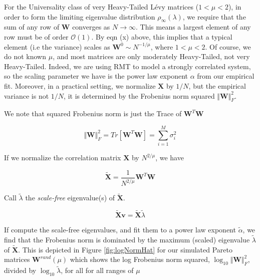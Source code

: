 For the Universality class of very Heavy-Tailed L\'evy matrices ($1<\mu<2$), in order to form the limiting eigenvalue distribution $\rho_{\infty}(\lambda)$,
we require that the sum of any row of $\mathbf{W}$ converges as $N\rightarrow\infty$. This means a largest  element of any row
must be of order $\mathcal{O}(1)$.  By eqn (x) above, this implies that a typical element  (i.e the variance) scales as $\mathbf{W}^{0}\sim N^{-1/\mu}$, where $1<\mu<2$.
Of course, we do not known $\mu$, and most matrices are only moderately Heavy-Tailed, not very Heavy-Tailed.
Indeed, we are using RMT to model a strongly correlated system, so the scaling parameter
we have is the power law exponent $\alpha$ from our empirical fit.
Moreover, in a practical setting, we normalize $\mathbf{X}$ by $1/N$, but the empirical variance is not $1/N$, it is determined by the Frobenius norm squared
$\Vert\mathbf{W}\Vert^{2}_{F}$.   

We note that squared Frobenius norm is just the Trace of $\mathbf{W}^{T}\mathbf{W}$

$$\Vert\mathbf{W}\Vert_{F}^{2}=Tr[\mathbf{W}^{T}\mathbf{W}]=\sum_{i=1}^{M}\sigma^{2}_{i}$$

If we normalize the correlation matrix $\mathbf{X}$ by $N^{2/\mu}$, we have

$$\tilde{\mathbf{X}}=\dfrac{1}{N^{2/\mu}}\mathbf{W}^{T}\mathbf{W}$$

Call $\tilde{\lambda}$ the \emph{scale-free} eigenvalue(s) of $\tilde{\mathbf{X}}$.

$$\tilde{\mathbf{X}}\mathbf{v}=\tilde{\mathbf{X}}\tilde{\lambda}$$

If compute the scale-free eigenvalues, and fit them to a power law exponent $\tilde{\alpha}$, we find that the Frobenius norm is dominated by the maximum (scaled) eigenvalue $\tilde{\lambda}$ of $\tilde{\mathbf{X}}$.  
This is depicted in Figure 
  \ref{fig:logNormHat}
for our simulated Pareto matrices  $\mathbf{W}^{rand}(\mu)$ which shows
the log Frobenius norm squared, $\log_{10}\Vert\mathbf{W}\Vert^{2}_{F}$, divided by $\log_{10}\tilde{\lambda}$,
for all for all ranges of $\mu$

